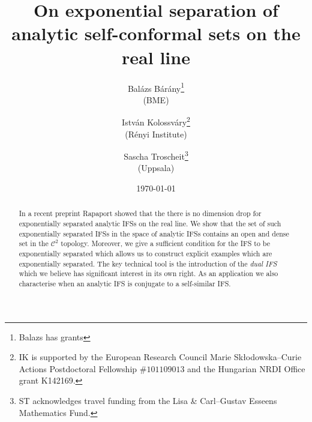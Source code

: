 \documentclass[12pt,]{article}
\title{On exponential separation of analytic self-conformal sets on the real line}
\author{Bal\'azs B\'ar\'any\footnote{Balazs has grants}\\(BME) \and Istv\'an
  Kolossv\'ary\footnote{IK is supported by the European Research Council Marie Sk\l odowska--Curie Actions Postdoctoral Fellowship $\#101109013$ and the Hungarian NRDI Office grant K142169.}\\ (R\'enyi Institute) \and Sascha
Troscheit\footnote{ST acknowledges travel funding from the Lisa \& Carl--Gustav Esseens Mathematics
Fund.} \\(Uppsala)}
\date{\today}
\theoremstyle{definition}
\theoremstyle{remark}
\newcommand{\0}{\mathbf{0}}
\begin{document}
\frenchspacing
\maketitle

\begin{abstract}
In a recent preprint Rapaport showed that the there is no dimension drop for
exponentially separated analytic IFSs on the real line. We show that the set of such exponentially
separated IFSs in the space of analytic IFSs contains an open and dense set in the $\mathcal{C}^2$
topology. Moreover, we give a sufficient condition for the IFS to be exponentially separated which
allows us to construct explicit examples which are exponentially separated. The key
technical tool is the introduction of the \emph{dual IFS} which we believe has significant interest
in its own right. As an application we also characterise when an analytic IFS is conjugate to a
self-similar IFS. 
\end{abstract}
\end{document}
